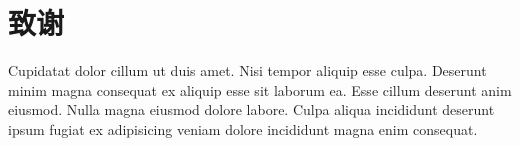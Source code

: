 \section*{致谢}

Cupidatat dolor cillum ut duis amet. Nisi tempor aliquip esse culpa.
Deserunt minim magna consequat ex aliquip esse sit laborum ea. Esse cillum
deserunt anim eiusmod. Nulla magna eiusmod dolore labore. Culpa aliqua
incididunt deserunt ipsum fugiat ex adipisicing veniam dolore incididunt
magna enim consequat.

\newpage
